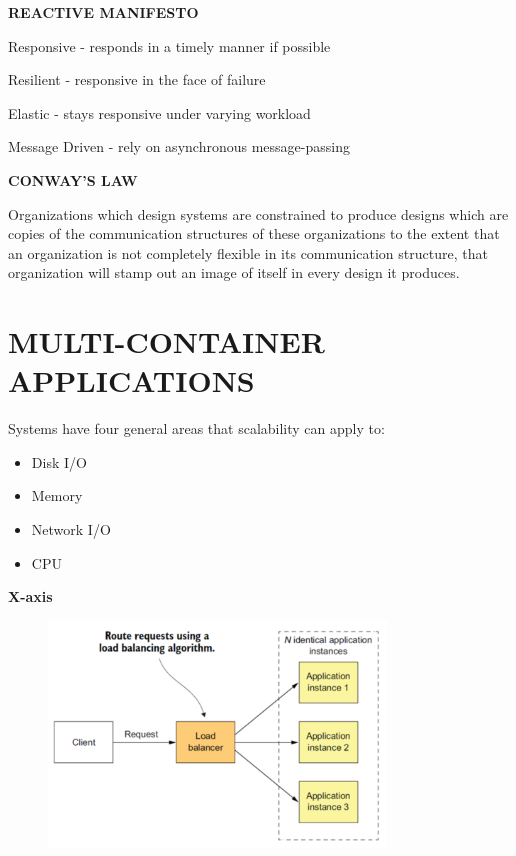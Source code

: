 \textbf{REACTIVE MANIFESTO}

Responsive - responds in a timely manner if possible

Resilient - responsive in the face of failure

Elastic - stays responsive under varying workload

Message Driven - rely on asynchronous message-passing

\textbf{CONWAY’S LAW}

Organizations which design systems are constrained to produce designs which are copies of the communication structures of these organizations to the extent that an organization is not completely flexible in its communication structure, that organization will stamp out an image of itself in every design it produces.

\section{MULTI-CONTAINER APPLICATIONS}
Systems have four general areas that scalability can apply to:
\begin{itemize}
    \item Disk I/O
    \item Memory
    \item Network I/O
    \item CPU
\end{itemize}


\textbf{X-axis}
\begin{figure}[ht!]
\centering
\includegraphics[width=0.8\textwidth]{oborove/SWA/img/x_axis.png}
\end{figure}

